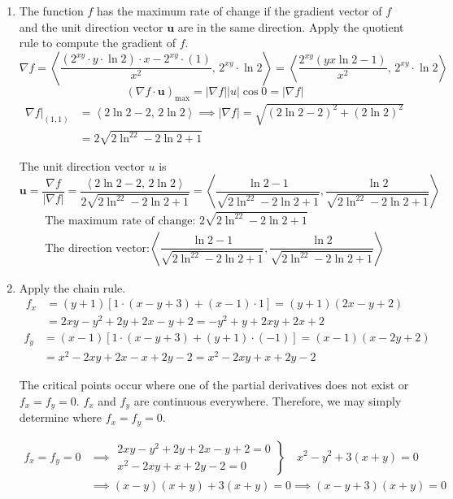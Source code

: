 \documentclass[a4paper, 12pt]{article}
\begin{document}
\begin{enumerate}[leftmargin=*,label=\textbf{\arabic*.}]
\item The function $f$ has the maximum rate of change if the gradient vector of $f$ and the unit direction vector $\mathbf u$ are in the same direction. Apply the quotient rule to compute the gradient of $f$.
\[\nabla f=\left\langle\frac{\left(2^{xy}\cdot y\cdot\ln2\right)\cdot x-2^{xy}\cdot(1)}{x^2},\,2^{xy}\cdot\ln2\right\rangle=\left\langle\frac{2^{xy}\left(yx\ln2-1\right)}{x^2},\,2^{xy}\cdot\ln2\right\rangle\]
\[\left(\nabla f\cdot\mathbf u\right)_{\text{max}}=\left|\nabla f\right||u|\cos0=|\nabla f|\]
\begin{align*}\nabla f|_{(1,1)}&=\left\langle2\ln2-2,\,2\ln2\right\rangle\implies|\nabla f|=\sqrt{\left(2\ln2-2\right)^2+\left(2\ln2\right)^2}\\[1em]&=2\sqrt{2\ln^22-2\ln2+1}\end{align*}

The unit direction vector $u$ is
\[\mathbf{u}=\frac{\nabla f}{|\nabla f|}=\frac{\left\langle2\ln2-2,\,2\ln2\right\rangle}{2\sqrt{2\ln^22-2\ln2+1}}=\left\langle\frac{\ln2-1}{\sqrt{2\ln^22-2\ln2+1}},\frac{\ln2}{\sqrt{2\ln^22-2\ln2+1}}\right\rangle\]
\[\boxed{\begin{array}{c}\text{The maximum rate of change: }{2\sqrt{2\ln^22-2\ln2+1}}\\[1em]\text{The direction vector:}\left\langle\dfrac{\ln2-1}{\sqrt{2\ln^22-2\ln2+1}},\dfrac{\ln2}{\sqrt{2\ln^22-2\ln2+1}}\right\rangle\end{array}}\]

\item Apply the chain rule.
\begin{align*}f_x&=(y+1)\left[1\cdot(x-y+3)+(x-1)\cdot1\right]=(y+1)(2x-y+2)\\[1em]&=2xy-y^2+2y+2x-y+2=-y^2+y+2xy+2x+2\end{align*}
\begin{align*}f_y&=(x-1)\left[1\cdot(x-y+3)+(y+1)\cdot(-1)\right]=(x-1)(x-2y+2)\\[1em]&=x^2-2xy+2x-x+2y-2=x^2-2xy+x+2y-2\end{align*}

The critical points occur where one of the partial derivatives does not exist or $f_x=f_y=0$. $f_x$ and $f_y$ are continuous everywhere. Therefore, we may simply determine where $f_x=f_y=0$.

\begin{align*}f_x=f_y=0&\implies\left.\begin{array}{r}
2xy-y^2+2y+2x-y+2=0\\
x^2-2xy+x+2y-2=0
\end{array}\right\}\quad x^2-y^2+3(x+y)=0\\[1em]&\implies(x-y)(x+y)+3(x+y)=0\implies(x-y+3)(x+y)=0\end{align*}


\end{enumerate}
\end{document}
